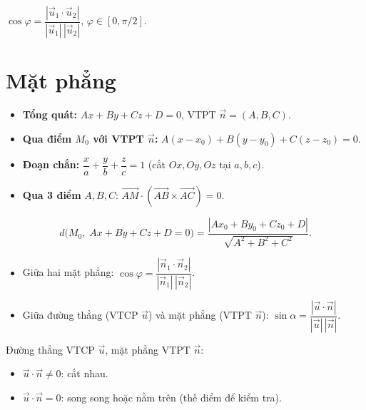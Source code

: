 \documentclass[12pt,a4paper]{article}
\begin{document}
\begin{congthuc}[title={Góc giữa hai đường thẳng}]
  $\cos\varphi = \dfrac{|\vec{u}_1 \cdot \vec{u}_2|}{|\vec{u}_1|\,|\vec{u}_2|}$, \quad $\varphi \in [0, \pi/2]$.
\end{congthuc}

\section{Mặt phẳng}

\begin{dinhnghia}[title={Các dạng phương trình mặt phẳng}]
  \begin{itemize}
    \item \textbf{Tổng quát:} $Ax + By + Cz + D = 0$, VTPT $\vec{n} = (A, B, C)$.
    \item \textbf{Qua điểm $M_0$ với VTPT $\vec{n}$:} $A(x - x_0) + B(y - y_0) + C(z - z_0) = 0$.
    \item \textbf{Đoạn chắn:} $\dfrac{x}{a} + \dfrac{y}{b} + \dfrac{z}{c} = 1$ \;(cắt $Ox, Oy, Oz$ tại $a, b, c$).
    \item \textbf{Qua 3 điểm} $A, B, C$: $\overrightarrow{AM} \cdot (\overrightarrow{AB} \times \overrightarrow{AC}) = 0$.
  \end{itemize}
\end{dinhnghia}

\begin{congthuc}[title={Khoảng cách từ điểm đến mặt phẳng}]
  \[
    d\bigl(M_0,\; Ax + By + Cz + D = 0\bigr) = \frac{|Ax_0 + By_0 + Cz_0 + D|}{\sqrt{A^2 + B^2 + C^2}}.
  \]
\end{congthuc}

\begin{congthuc}[title={Góc}]
  \begin{itemize}
    \item Giữa hai mặt phẳng: $\cos\varphi = \dfrac{|\vec{n}_1 \cdot \vec{n}_2|}{|\vec{n}_1|\,|\vec{n}_2|}$.
    \item Giữa đường thẳng (VTCP $\vec{u}$) và mặt phẳng (VTPT $\vec{n}$): $\sin\alpha = \dfrac{|\vec{u} \cdot \vec{n}|}{|\vec{u}|\,|\vec{n}|}$.
  \end{itemize}
\end{congthuc}

\begin{phuongphap}[title={Vị trí tương đối đường thẳng và mặt phẳng}]
  Đường thẳng VTCP $\vec{u}$, mặt phẳng VTPT $\vec{n}$:
  \begin{itemize}
    \item $\vec{u} \cdot \vec{n} \ne 0$: cắt nhau.
    \item $\vec{u} \cdot \vec{n} = 0$: song song hoặc nằm trên (thế điểm để kiểm tra).
  \end{itemize}
\end{phuongphap}
\end{document}
